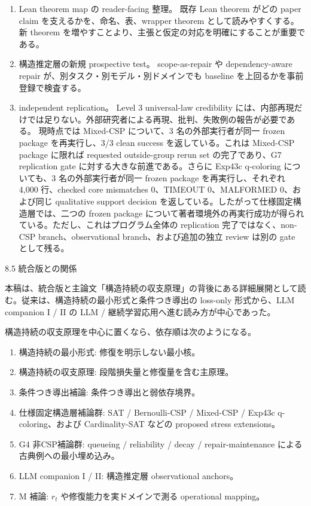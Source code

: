 \documentclass[12pt,a4paper]{article}
\begin{document}
\begin{enumerate}
\def\labelenumi{\arabic{enumi}.}
\setcounter{enumi}{2}
\item
  Lean theorem map の reader-facing 整理。 既存 Lean theorem がどの paper claim を支えるかを、命名、表、wrapper theorem として読みやすくする。新 theorem を増やすことより、主張と仮定の対応を明確にすることが重要である。
\item
  構造推定層の新規 prospective test。 scope-as-repair や dependency-aware repair が、別タスク・別モデル・別ドメインでも baseline を上回るかを事前登録で検査する。
\item
  independent replication。 Level 3 universal-law credibility には、内部再現だけでは足りない。外部研究者による再現、批判、失敗例の報告が必要である。 現時点では Mixed-CSP について、3 名の外部実行者が同一 frozen package を再実行し、3/3 clean success を返している。これは Mixed-CSP package に限れば requested outside-group rerun set の完了であり、G7 replication gate に対する大きな前進である。さらに Exp43c q-coloring についても、3 名の外部実行者が同一 frozen package を再実行し、それぞれ 4,000 行、checked core mismatches 0、TIMEOUT 0、MALFORMED 0、および同じ qualitative support decision を返している。したがって仕様固定構造層では、二つの frozen package について著者環境外の再実行成功が得られている。ただし、これはプログラム全体の replication 完了ではなく、non-CSP branch、observational branch、および追加の独立 review は別の gate として残る。
\end{enumerate}

8.5 統合版との関係

本稿は、統合版と主論文「構造持続の収支原理」の背後にある詳細展開として読む。従来は、構造持続の最小形式と条件つき導出の loss-only 形式から、LLM companion I / II の LLM / 継続学習応用へ進む読み方が中心であった。

構造持続の収支原理を中心に置くなら、依存順は次のようになる。

\begin{enumerate}
\def\labelenumi{\arabic{enumi}.}
\tightlist
\item
  構造持続の最小形式: 修復を明示しない最小核。
\item
  構造持続の収支原理: 段階損失量と修復量を含む主原理。
\item
  条件つき導出補論: 条件つき導出と弱依存境界。
\item
  仕様固定構造層補論群: SAT / Bernoulli-CSP / Mixed-CSP / Exp43c q-coloring、および Cardinality-SAT などの proposed stress extensions。
\item
  G4 非CSP補論群: queueing / reliability / decay / repair-maintenance による古典例への最小埋め込み。
\item
  LLM companion I / II: 構造推定層 observational anchors。
\item
  M 補論: \(r_{t}\) や修復能力を実ドメインで測る operational mapping。
\end{enumerate}
\end{document}
